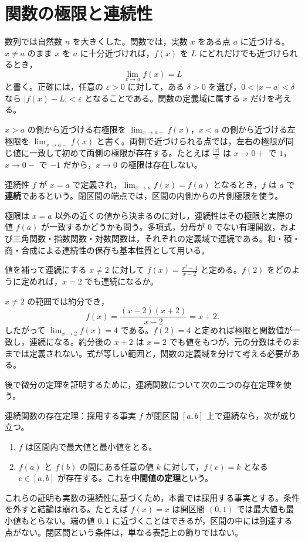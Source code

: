 \section{関数の極限と連続性}\label{節:関数極限連続}
数列では自然数 $n$ を大きくした。関数では，実数 $x$ をある点 $a$ に近づける。$x\ne a$ のまま $x$ を $a$ に十分近づければ，$f(x)$ を $L$ にどれだけでも近づけられるとき，
\[
 \lim_{x\to a}f(x)=L
\]
と書く。正確には，任意の $\varepsilon>0$ に対して，ある $\delta>0$ を選び，$0<|x-a|<\delta$ なら $|f(x)-L|<\varepsilon$ となることである。関数の定義域に属する $x$ だけを考える。

$x>a$ の側から近づける右極限を $\lim_{x\to a+}f(x)$，$x<a$ の側から近づける左極限を $\lim_{x\to a-}f(x)$ と書く。両側で近づけられる点では，左右の極限が同じ値に一致して初めて両側の極限が存在する。たとえば $\frac{|x|}{x}$ は $x\to0+$ で $1$，$x\to0-$ で $-1$ だから，$x\to0$ の極限は存在しない。

\begin{definition}{連続性}
$f$ が $x=a$ で定義され，$\lim_{x\to a}f(x)=f(a)$ となるとき，$f$ は $a$ で\textbf{連続}であるという。閉区間の端点では，区間の内側からの片側極限を使う。
\end{definition}

極限は $x=a$ 以外の近くの値から決まるのに対し，連続性はその極限と実際の値 $f(a)$ が一致するかどうかも問う。多項式，分母が $0$ でない有理関数，および三角関数・指数関数・対数関数は，それぞれの定義域で連続である。和・積・商・合成による連続性の保存も基本性質として用いる。

\begin{example}{値を補って連続にする}
$x\ne2$ に対して $f(x)=\frac{x^2-4}{x-2}$ と定める。$f(2)$ をどのように定めれば，$x=2$ でも連続になるか。
\end{example}
$x\ne2$ の範囲では約分でき，
\[
 f(x)=\frac{(x-2)(x+2)}{x-2}=x+2.
\]
したがって $\lim_{x\to2}f(x)=4$ である。$f(2)=4$ と定めれば極限と関数値が一致し，連続になる。約分後の $x+2$ は $x=2$ でも値をもつが，元の分数はそのままでは定義されない。式が等しい範囲と，関数の定義域を分けて考える必要がある。

後で微分の定理を証明するために，連続関数について次の二つの存在定理を使う。

\begin{theorem}{連続関数の存在定理：採用する事実}\label{定理:連続関数存在}
$f$ が閉区間 $[a,b]$ 上で連続なら，次が成り立つ。
\begin{enumerate}[label=(\arabic*),leftmargin=*]
 \item $f$ は区間内で最大値と最小値をとる。
 \item $f(a)$ と $f(b)$ の間にある任意の値 $k$ に対して，$f(c)=k$ となる $c\in[a,b]$ が存在する。これを\textbf{中間値の定理}という。
\end{enumerate}
\end{theorem}

これらの証明も実数の連続性に基づくため，本書では採用する事実とする。条件を外すと結論は崩れる。たとえば $f(x)=x$ は開区間 $(0,1)$ では最大値も最小値もとらない。端の値 $0,1$ に近づくことはできるが，区間の中には到達する点がない。閉区間という条件は，単なる表記上の飾りではない。

